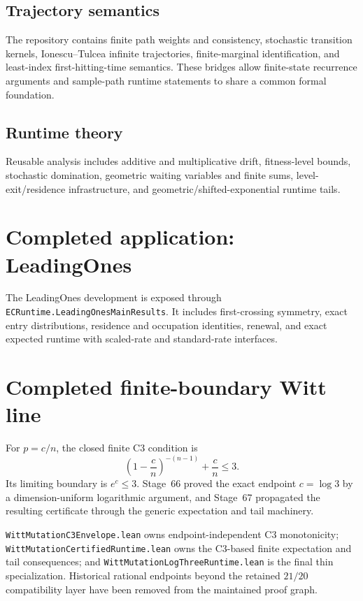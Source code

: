 \documentclass[11pt]{article}
\begin{document}
\subsection{Trajectory semantics}

The repository contains finite path weights and consistency, stochastic transition
kernels, Ionescu--Tulcea infinite trajectories, finite-marginal identification, and
least-index first-hitting-time semantics. These bridges allow finite-state recurrence
arguments and sample-path runtime statements to share a common formal foundation.

\subsection{Runtime theory}

Reusable analysis includes additive and multiplicative drift, fitness-level bounds,
stochastic domination, geometric waiting variables and finite sums, level-exit/residence
infrastructure, and geometric/shifted-exponential runtime tails.

\section{Completed application: LeadingOnes}

The LeadingOnes development is exposed through
\texttt{ECRuntime.LeadingOnesMainResults}. It includes first-crossing symmetry, exact
entry distributions, residence and occupation identities, renewal, and exact expected
runtime with scaled-rate and standard-rate interfaces.

\section{Completed finite-boundary Witt line}

For $p=c/n$, the closed finite C3 condition is
\[
  \left(1-\frac cn\right)^{-(n-1)}+\frac cn\le3.
\]
Its limiting boundary is $e^c\le3$. Stage~66 proved the exact endpoint $c=\log3$ by a
dimension-uniform logarithmic argument, and Stage~67 propagated the resulting certificate
through the generic expectation and tail machinery.

\texttt{WittMutationC3Envelope.lean} owns endpoint-independent C3 monotonicity;
\texttt{WittMutationCertifiedRuntime.lean} owns the C3-based finite expectation and tail
consequences; and \texttt{WittMutationLogThreeRuntime.lean} is the final thin
specialization. Historical rational endpoints beyond the retained $21/20$ compatibility
layer have been removed from the maintained proof graph.
\end{document}
